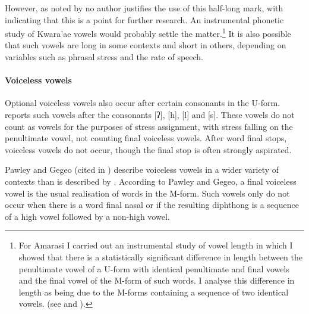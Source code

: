 However, as noted by \citet[25]{he04} no author justifies the use of this half-long mark,
with \citeauthor{he04} indicating that this is a point for further research.
An instrumental phonetic study of Kwara'ae vowels
would probably settle the matter.\footnote{
		For Amarasi I carried out an instrumental study of vowel length
		in which I showed that there is a statistically significant
		difference in length between the penultimate vowel of a U-form
		with identical penultimate and final vowels and the final
		vowel of the M-form of such words.
		I analyse this difference in length as being due to the M-forms
		containing a sequence of two identical vowels.
		(see  and ).}
It is also possible that such vowels are long in some contexts and short in others,
depending on variables such as phrasal stress and the rate of speech.

\paragraph{Voiceless vowels}\label{sec:KwaVoiVow}
Optional voiceless vowels also occur after certain consonants in the U-form.
\citet[19]{he04} reports such vowels after the consonants [ʔ], [h], [l] and [s].
These vowels do not count as vowels for the purposes of stress assignment,
with stress falling on the penultimate vowel, not counting final voiceless vowels.
After word final stops, voiceless vowels do not occur,
though the final stop is often strongly aspirated.

\begin{exe}
	\label{KwvoicelessVH}
\end{exe}

Pawley and Gegeo (cited in \citealt{blga98})
describe voiceless vowels in a wider variety of contexts than is described by \citet{he04}.
According to Pawley and Gegeo, a final voiceless vowel is the usual realisation of words in the M-form.
Such vowels only do not occur when there is a word final nasal
or if the resulting diphthong is a sequence of a high vowel followed by a non-high vowel.

